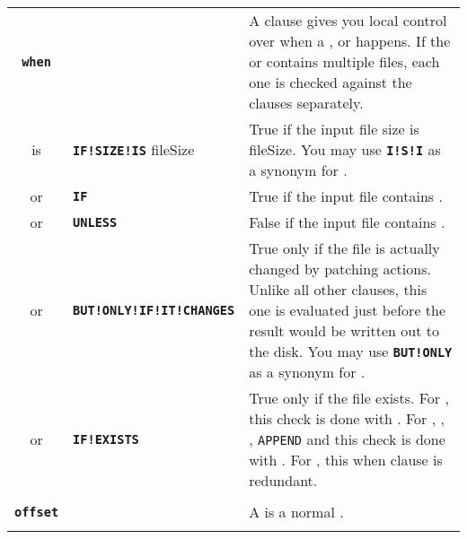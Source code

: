 \documentclass{article}
\def\ttref#1{\ahrefloc{#1}{\tt #1}}
\def\DEFINE#1{{\tt \bf #1}\label{#1}\index{#1}}
\def\t#1{{\tt #1}}
\begin{document}
\begin{tabular}{cp{10in}|p{10in}}
\DEFINE{when} & & A \ttref{when} clause gives you local control over when a
  \ttref{COPY}, \ttref{COPY!EXISTING} or \ttref{APPEND!COL} happens. If the
  \ttref{COPY} or \ttref{COPY!EXISTING} contains multiple files, each one
  is checked against the \ttref{when} clauses separately.  \\
is & \DEFINE{IF!SIZE!IS} fileSize & True if the input file size is
fileSize. You may use \DEFINE{I!S!I} as a synonym for \ttref{IF!SIZE!IS}. \\
or & \DEFINE{IF} \ttref{regexp} & True if the input file contains
\ttref{regexp}. \\
or & \DEFINE{UNLESS} \ttref{regexp} & False if the input file contains
\ttref{regexp}.  \\
or & \DEFINE{BUT!ONLY!IF!IT!CHANGES} & True only if the file is actually
changed by patching actions. Unlike all other \ttref{when} clauses, this
one is evaluated just before the result would be written out to the disk.
You may use \DEFINE{BUT!ONLY} as a synonym for \ttref{BUT!ONLY!IF!IT!CHANGES}. \\
or & \DEFINE{IF!EXISTS} &

True only if the file exists. For \ttref{COPY}, this check is done
with \ttref{FILE!EXISTS}. For \ttref{COPY!EXISTING},
\ttref{COPY!EXISTING!REGEXP}, \ttref{COPY!RANDOM}, \t{APPEND} and
\ttref{APPEND!COL} this check is done with
\ttref{FILE!EXISTS!IN!GAME}. For \ttref{COPY!ALL!GAM!FILES}, this when
clause is redundant. \\

\\

\DEFINE{offset} & & A \ttref{offset} is a normal \ttref{value}.
\\

\\



\end{tabular}
\end{document}
